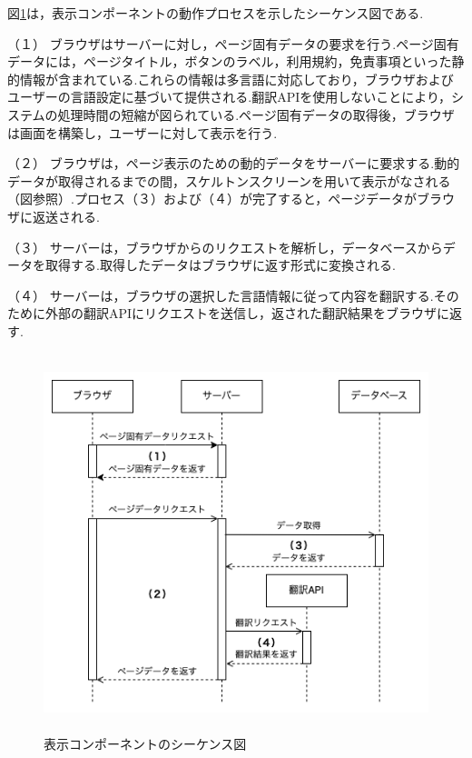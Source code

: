 \documentclass[b5paper,12pt,dvipdfmx]{jsreport}
\begin{document}
図\ref{display_component_sequence_diagram}は，表示コンポーネントの動作プロセスを示したシーケンス図である.

（１）
ブラウザはサーバーに対し，ページ固有データの要求を行う.ページ固有データには，ページタイトル，ボタンのラベル，利用規約，免責事項といった静的情報が含まれている.これらの情報は多言語に対応しており，ブラウザおよびユーザーの言語設定に基づいて提供される.翻訳APIを使用しないことにより，システムの処理時間の短縮が図られている.ページ固有データの取得後，ブラウザは画面を構築し，ユーザーに対して表示を行う.

（２）
ブラウザは，ページ表示のための動的データをサーバーに要求する.動的データが取得されるまでの間，スケルトンスクリーンを用いて表示がなされる（図参照）.プロセス（３）および（４）が完了すると，ページデータがブラウザに返送される.

（３）
サーバーは，ブラウザからのリクエストを解析し，データベースからデータを取得する.取得したデータはブラウザに返す形式に変換される.

（４）
サーバーは，ブラウザの選択した言語情報に従って内容を翻訳する.そのために外部の翻訳APIにリクエストを送信し，返された翻訳結果をブラウザに返す.



\newpage

\begin{figure}[H]
    \centering
    \includegraphics[width=120mm,height=110mm]{./img/components/display_component_sequence_diagram.png}
    \caption{表示コンポーネントのシーケンス図}
    \label{display_component_sequence_diagram}
\end{figure}
\end{document}
